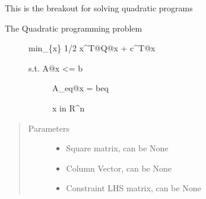 \documentclass[letterpaper,10pt,english]{sphinxmanual}
\begin{document}
\begin{fulllineitems}
\begin{fulllineitems}
\label{\detokenize{ppopt:ppopt.solver.Solver.solve_qp}}
\sphinxAtStartPar
This is the breakout for solving quadratic programs
\begin{description}
\item[{The Quadratic programming problem}] \leavevmode
\sphinxAtStartPar
min\_\{x\} 1/2 x\textasciicircum{}T@Q@x + c\textasciicircum{}T@x
\begin{description}
\item[{s.t.   A@x \textless{}= b}] \leavevmode
\sphinxAtStartPar
A\_eq@x = beq

\sphinxAtStartPar
x in R\textasciicircum{}n

\end{description}

\end{description}
\begin{quote}\begin{description}
\item[{Parameters}] \leavevmode\begin{itemize}
\item {} 
\sphinxAtStartPar
{} \textendash{} Square matrix, can be None

\item {} 
\sphinxAtStartPar
{} \textendash{} Column Vector, can be None

\item {} 
\sphinxAtStartPar
{} \textendash{} Constraint LHS matrix, can be None


\end{itemize}
\end{description}
\end{quote}
\end{fulllineitems}
\end{fulllineitems}
\end{document}
